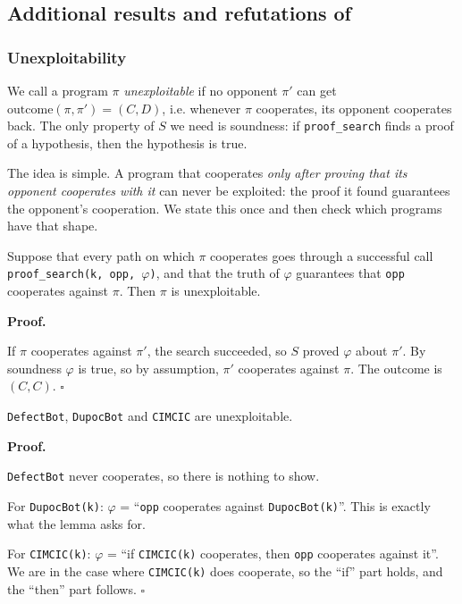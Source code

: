 \documentclass[twoside,11pt]{article}
\renewcommand{\BlackBox}{\ensuremath{\square}}
\renewenvironment{proof}[1][Proof]{%
  \par\noindent\textbf{#1.}\enspace\ignorespaces
}{%
  \ifhmode\unskip\nobreak\hfill\quad\else\noindent\hfill\fi
  \BlackBox\par\addvspace{2mm}%
}
\begin{document}
\subsection{Additional results and refutations of \citet{Critch}}
\label{apx-subsection:Theory-AddResultsCritch}

\subsubsection{Unexploitability}
\label{apx-subsubsection:Theory-AddResultsCritch-Unexploitability}

We call a program $\pi$ \emph{unexploitable} if no opponent $\pi'$ can get $\mathrm{outcome}(\pi, \pi') = (C, D)$, i.e. whenever $\pi$ cooperates, its opponent cooperates back. The only property of $S$ we need is soundness: if \texttt{proof\_search} finds a proof of a hypothesis, then the hypothesis is true.

The idea is simple. A program that cooperates \emph{only after proving that its opponent cooperates with it} can never be exploited: the proof it found guarantees the opponent's cooperation. We state this once and then check which programs have that shape.

\begin{lemma}\label{lem:apx-guard-witness}
Suppose that every path on which $\pi$ cooperates goes through a successful call \texttt{proof\_search(k, opp, $\varphi$)}, and that the truth of $\varphi$ guarantees that \texttt{opp} cooperates against $\pi$. Then $\pi$ is unexploitable.
\end{lemma}
\begin{proof}
If $\pi$ cooperates against $\pi'$, the search succeeded, so $S$ proved $\varphi$ about $\pi'$. By soundness $\varphi$ is true, so by assumption, $\pi'$ cooperates against $\pi$. The outcome is $(C,C)$.
\end{proof}

\begin{proposition}
\texttt{DefectBot}, \texttt{DupocBot} and \texttt{CIMCIC} are unexploitable.
\end{proposition}
\begin{proof}
\texttt{DefectBot} never cooperates, so there is nothing to show. 

For \texttt{DupocBot(k)}: $\varphi$ = \enquote{\texttt{opp} cooperates against \texttt{DupocBot(k)}}. This is exactly what the lemma asks for.

For \texttt{CIMCIC(k)}: $\varphi$ = \enquote{if \texttt{CIMCIC(k)} cooperates, then \texttt{opp} cooperates against it}. We are in the case where \texttt{CIMCIC(k)} does cooperate, so the \enquote{if} part holds, and the \enquote{then} part follows.
\end{proof}
\end{document}
